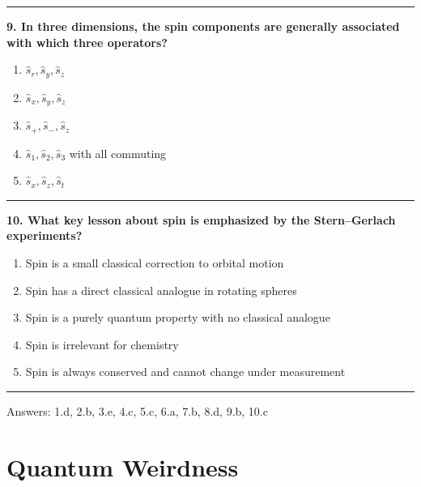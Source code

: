 \documentclass[
  english,
  9pt,
]{extbook}
\providecommand{\tightlist}{%
  \setlength{\itemsep}{0pt}\setlength{\parskip}{0pt}}
\theoremstyle{definition}
\theoremstyle{definition}
\theoremstyle{definition}
\theoremstyle{definition}
\theoremstyle{remark}
\begin{document}
\begin{center}\rule{0.5\linewidth}{0.5pt}\end{center}

\textbf{9. In three dimensions, the spin components are generally associated with which three operators?}

\begin{enumerate}
\def\labelenumi{\alph{enumi}.}
\tightlist
\item
  \(\hat{s}_r, \hat{s}_y, \hat{s}_z\)\\
\item
  \(\hat{s}_x, \hat{s}_y, \hat{s}_z\)\\
\item
  \(\hat{s}_+, \hat{s}_-, \hat{s}_z\)\\
\item
  \(\hat{s}_1, \hat{s}_2, \hat{s}_3\) with all commuting\\
\item
  \(\hat{s}_x, \hat{s}_z, \hat{s}_t\)
\end{enumerate}

\begin{center}\rule{0.5\linewidth}{0.5pt}\end{center}

\textbf{10. What key lesson about spin is emphasized by the Stern--Gerlach experiments?}

\begin{enumerate}
\def\labelenumi{\alph{enumi}.}
\tightlist
\item
  Spin is a small classical correction to orbital motion\\
\item
  Spin has a direct classical analogue in rotating spheres\\
\item
  Spin is a purely quantum property with no classical analogue\\
\item
  Spin is irrelevant for chemistry\\
\item
  Spin is always conserved and cannot change under measurement
\end{enumerate}

\begin{center}\rule{0.5\linewidth}{0.5pt}\end{center}

Answers: 1.d, 2.b, 3.e, 4.c, 5.c, 6.a, 7.b, 8.d, 9.b, 10.c

\chapter{Quantum Weirdness}\label{Weirdness}
\end{document}

